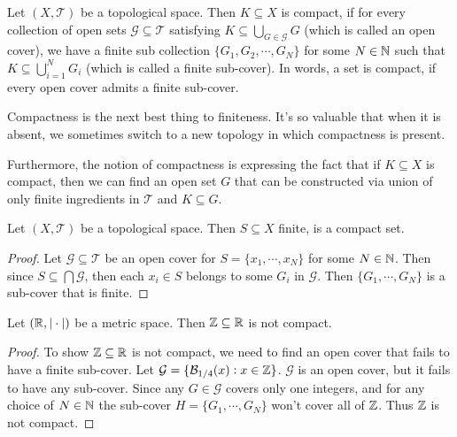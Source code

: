 \begin{definition}[Compactness]
	Let $(X,\mathcal{T})$ be a topological space. Then $K \subseteq X$ is compact, if for every collection of open sets $\mathcal{G} \subseteq \mathcal{T}$ satisfying $K \subseteq \bigcup_{G \in \mathcal{G}} G$ (which is called an open cover), we have a finite sub collection $\{ G_1, G_2, \cdots, G_N \}$ for some $N \in \mathbb{N}$ such that $K \subseteq \bigcup_{i=1}^N G_i$ (which is called a finite sub-cover).
	In words, a set is compact, if every open cover admits a finite sub-cover.
\end{definition}


\begin{remark}
	Compactness is the next best thing to finiteness. It's so valuable that when it is absent, we sometimes switch to a new topology in which compactness is present. 
\end{remark}

Furthermore, the notion of compactness is expressing the fact that if $K \subseteq X$ is compact, then we can find an open set $G$ that can be constructed via union of only finite ingredients in $\mathcal{T}$ and $K \subseteq G$.

\begin{lemma}
	Let $(X,\mathcal{T})$ be a topological space. Then $S \subseteq X$ finite, is a compact set.
\end{lemma}

\begin{proof}
	Let $\mathcal{G} \subseteq \mathcal{T}$ be an open cover for $S = \{x_1, \cdots, x_N\}$ for some $N \in \mathbb{N}$. Then since $S \subseteq \bigcap \mathcal{G}$, then each $x_i \in S$ belongs to some $G_i$ in $\mathcal{G}$. Then $\{G_1, \cdots, G_N \}$ is a sub-cover that is finite.
\end{proof}

\begin{lemma}
	Let $(\mathbb{R}, |\cdot|)$ be a metric space. Then $\mathbb{Z} \subseteq \mathbb{R}$ is not compact.
\end{lemma}

\begin{proof}
	To show $\mathbb{Z} \subseteq \mathbb{R}$ is not compact, we need to find an open cover that fails to have a finite sub-cover. Let $\mathcal{G} = \{ \mathcal{B}_{1/4}(x): x\in \mathbb{Z} \}$. $\mathcal{G}$ is an open cover, but it fails to have any sub-cover. Since any $G \in \mathcal{G}$ covers only one integers, and for any choice of $N \in \mathbb{N}$ the sub-cover $H = \{ G_1, \cdots, G_N\}$ won't cover all of $\mathbb{Z}$. Thus $\mathbb{Z}$ is not compact. 
\end{proof}

